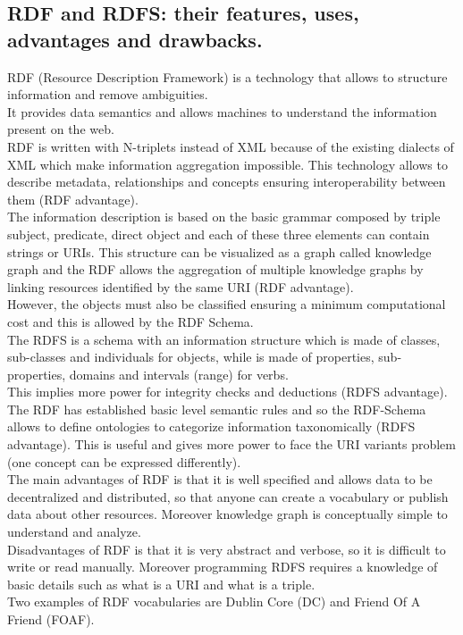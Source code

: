 \newpage

\subsection{RDF and RDFS: their features, uses, advantages and drawbacks.}
RDF (Resource Description Framework) is a technology that allows
to structure information and remove ambiguities.\\
It provides data semantics and allows machines to understand the
information present on the web.\\
RDF is written with N-triplets instead of XML because of the existing
dialects of XML which make information aggregation impossible.
This technology allows to describe metadata, relationships and concepts
ensuring interoperability between them (RDF advantage).\\
The information description is
based on the basic grammar composed by triple subject, predicate,
direct object and each of these three elements can contain strings or URIs.
This structure can be visualized as a graph called knowledge graph
and the RDF allows the aggregation of multiple knowledge graphs
by linking resources identified by the same URI (RDF advantage).\\
However, the objects must also be classified ensuring a minimum
computational cost and this is allowed by the RDF Schema.\\
The RDFS is a schema with an information structure which is made
of classes, sub-classes and individuals for objects,
while is made of
properties, sub-properties, domains and intervals (range) for verbs.\\
This implies more power for integrity checks and deductions (RDFS advantage).\\
The RDF has established basic level semantic rules and so
the RDF-Schema allows to define ontologies to categorize information
taxonomically (RDFS advantage). This is useful and gives more power
to face the URI variants problem (one concept can be expressed differently).
\\ The main advantages of RDF is that it is well specified
and allows data to be decentralized and distributed, so that anyone
can create a vocabulary or publish data about other
resources. Moreover knowledge graph is conceptually simple to understand
and analyze.
\\Disadvantages of RDF is that it is very abstract and verbose,
so it is difficult to write or read manually. Moreover programming
RDFS requires a knowledge of basic details such as what is a URI
and what is a triple.\\
Two examples of RDF vocabularies
are Dublin Core (DC) and Friend Of A Friend (FOAF).

